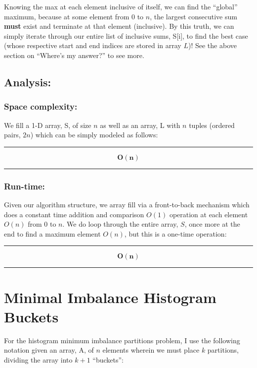 \documentclass[conference]{styles/acmsiggraph}
\newcommand{\?}{\stackrel{?}{=}}
\begin{document}
Knowing the max at each element inclusive of itself, we can find the \enquote{global} maximum, because at some element from $0$ to $n$, the largest consecutive sum \textbf{must} exist and terminate at that element (inclusive).  By this truth, we can simply iterate through our entire list of inclusive sums, S[i], to find the best case (whose respective start and end indices are stored in array $L$)! See the above section on \enquote{Where's my answer?} to see more.

\subsection{Analysis:}
\subsubsection*{Space complexity:}
We fill a 1-D array, S, of size $n$ as well as an array, L with $n$ tuples (ordered pairs, $2n$) which can be simply modeled as follows: \\
\rule{\textwidth}{0.4pt}
$$\mathbf{O(n)}$$
\rule{\textwidth}{0.4pt}


\subsubsection*{Run-time:}
Given our algorithm structure, we array fill via a front-to-back mechanism which does a constant time addition and comparison $O(1)$ operation at each element $O(n)$ from $0$ to $n$.  We do loop through the entire array, $S$, once more at the end to find a maximum element $O(n)$, but this is a one-time operation:\\

\rule{\textwidth}{0.4pt}
$$\mathbf{O(n)}$$
\rule{\textwidth}{0.4pt}
















\newpage


\section{Minimal Imbalance Histogram Buckets}

For the histogram minimum imbalance partitions problem, I use the following notation given an array, A, of $n$ elements wherein we must place $k$ partitions, dividing the array into $k+1$ \enquote{buckets}:
\end{document}

